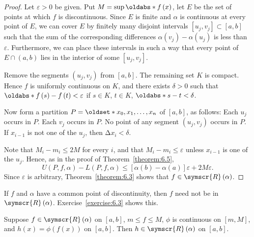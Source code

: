 \begin{proof}
    Let \(\varepsilon>0\) be given. Put \(M=\sup\abs[f\left(x\right)]\), let \(E\) be the set of points at which \(f\) is discontinuous. Since \(E\) is finite and \(\alpha\) is continuous at every point of \(E\), we can cover \(E\) by finitely many disjoint intervals \(\left[u_j,v_j\right]\subset\left[a,b\right]\) such that the sum of the corresponding differences \(\alpha\left(v_j\right)-\alpha\left(u_j\right)\) is less than \(\varepsilon\). Furthermore, we can place these intervals in such a way that every point of \(E\cap\left(a,b\right)\) lies in the interior of some \(\left[u_j,v_j\right]\).

    Remove the segments \(\left(u_j,v_j\right)\) from \(\left[a,b\right]\). The remaining set \(K\) is compact. Hence \(f\) is uniformly continuous on \(K\), and there exists \(\delta>0\) such that \(\abs[f\left(s\right)-f\left(t\right)]<\varepsilon\) if \(s\in K\), \(t\in K\), \(\abs[s-t]<\delta\).

    Now form a partition \(P=\set{x_0,x_1,\ldots,x_n}\) of \(\left[a,b\right]\), as follows: Each \(u_j\) occurs in \(P\). Each \(v_j\) occurs in \(P\). No point of any segment \(\left(u_j,v_j\right)\) occurs in \(P\). If \(x_{i-1}\) is not one of the \(u_j\), then \(\increment x_i<\delta\).

    Note that \(M_i-m_i\leqslant2M\) for every \(i\), and that \(M_i-m_i\leqslant\varepsilon\) unless \(x_{i-1}\) is one of the \(u_j\). Hence, as in the proof of Theorem~\ref{theorem:6.5},
    \begin{equation*}
        U\left(P,f,\alpha\right)-L\left(P,f,\alpha\right)\leqslant\left[\alpha\left(b\right)-\alpha\left(a\right)\right]\varepsilon+2M\varepsilon.
    \end{equation*}
    Since \(\varepsilon\) is arbitrary, Theorem~\ref{theorem:6.3} shows that \(f\in\symscr{R}\left(\alpha\right)\).
\end{proof}

\begin{note*}
    If \(f\) and \(\alpha\) have a common point of discontinuity, then \(f\) need not be in \(\symscr{R}\left(\alpha\right)\). Exercise~\ref{exercise:6.3} shows this.
\end{note*}

\begin{theorem}
    Suppose \(f\in\symscr{R}\left(\alpha\right)\) on \(\left[a,b\right]\), \(m\leqslant f\leqslant M\), \(\phi\) is continuous on \(\left[m,M\right]\), and \(h\left(x\right)=\phi\left(f\left(x\right)\right)\) on \(\left[a,b\right]\). Then \(h\in\symscr{R}\left(\alpha\right)\) on \(\left[a,b\right]\).
\end{theorem}

